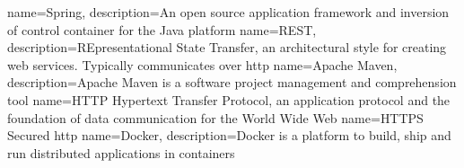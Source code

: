 {
  name={Spring},
  description={An open source application framework and inversion of control container for the Java platform}
}
{
  name={REST},
  description={REpresentational State Transfer, an architectural style for creating web services. Typically communicates over \gls{http}}
}
{
  name={Apache Maven},
  description={Apache Maven is a software project management and comprehension tool}
}
{
  name={HTTP}
}
{
	Hypertext Transfer Protocol, an application protocol and the foundation of data communication for the World Wide Web \cite{http_wikipedia}
}
{
  name={HTTPS}
}
{
	Secured \gls{http}
}
{
  name={Docker},
  description={Docker is a platform to build, ship and run distributed applications in containers}
}
